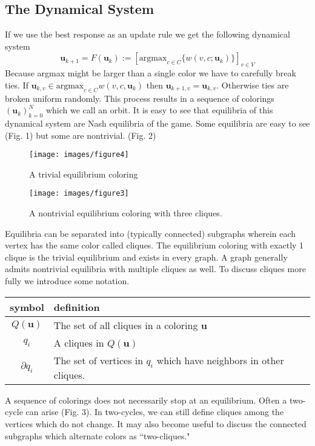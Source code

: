 \documentclass[]{article}
\begin{document}
\subsection{The Dynamical System}
If we use the best response as an update rule we get the following dynamical system
\begin{equation}
	\mathbf{u}_{k+1}=F(\mathbf{u}_k):=[\text{argmax}_{c\in C}\{w(v,c;\mathbf{u}_k)\} ]_{v\in V}
\end{equation}
Because argmax might be larger than a single color we have to carefully break ties. If $\mathbf{u}_{k,v}\in \text{argmax}_{c\in C}{w(v,c,\mathbf{u}_k)}$ then $\mathbf{u}_{k+1,v}=\mathbf{u}_{k,v}$. Otherwise ties are broken uniform randomly. This process results in a sequence of colorings $(\mathbf{u}_k)_{k=0}^N$ which we call an orbit. It is easy to see that equilibria of this dynamical system are Nash equilibria of the game. Some equilibria are easy to see (Fig. 1) but some are nontrivial. (Fig. 2)
\begin{figure}[h!]
	\texttt{[image: images/figure4]}
	\caption{A trivial equilibrium coloring}
\end{figure}
\begin{figure}
	\texttt{[image: images/figure3]}
	\caption{A nontrivial equilibrium coloring with three cliques.}
\end{figure}

Equilibria can be separated into (typically connected) subgraphs wherein each vertex has the same color called cliques. The equilibrium coloring with exactly 1 clique is the trivial equilibrium and exists in every graph. A graph generally admits nontrivial equilibria with multiple cliques as well. To discuss cliques more fully we introduce some notation.
\begin{center}
	\begin{tabular}{c|l}
		symbol&definition\\
		\hline
		$Q(\mathbf{u})$& The set of all cliques in a coloring $\mathbf{u}$\\
		$q_i$& A cliques in $Q(\mathbf{u})$\\
		$\partial q_i$ &The set of vertices in $q_i$ which have neighbors in other cliques. 	
	\end{tabular}
\end{center}

 A sequence of colorings does not necessarily stop at an equilibrium. Often a two-cycle can arise (Fig. 3). In two-cycles, we can still define cliques among the vertices which do not change. It may also become useful to discuss the connected subgraphs which alternate colors as ``two-cliques."
\end{document}
